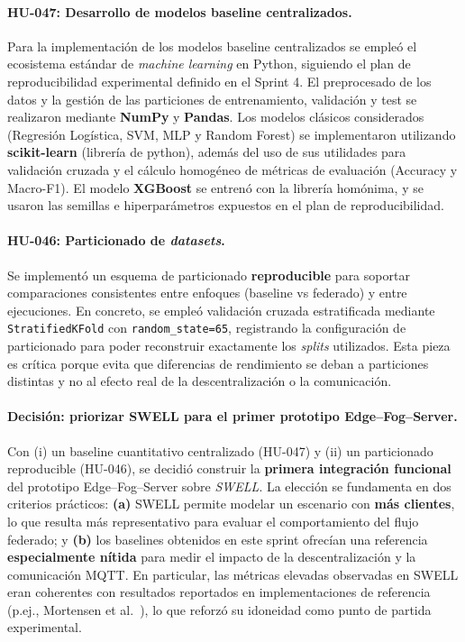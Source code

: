 \documentclass{report}
\begin{document}
\paragraph{HU-047: Desarrollo de modelos baseline centralizados.}
Para la implementación de los modelos baseline centralizados se empleó el ecosistema estándar de \textit{machine learning} en Python, siguiendo  el plan de reproducibilidad experimental definido en el Sprint 4. El preprocesado de los datos y la gestión de las particiones de entrenamiento, validación y test se realizaron mediante \textbf{NumPy} y \textbf{Pandas}. Los modelos clásicos considerados (Regresión Logística, SVM, MLP y Random Forest) se implementaron utilizando \textbf{scikit-learn} (librería de python), además del uso de sus utilidades para validación cruzada y el cálculo homogéneo de métricas de evaluación (Accuracy y Macro-F1). El modelo \textbf{XGBoost} se entrenó con la librería homónima, y se usaron las semillas e hiperparámetros expuestos en el plan de reproducibilidad. 


\vspace{0.15em}
\paragraph{HU-046: Particionado de \textit{datasets}.}
Se implementó un esquema de particionado \textbf{reproducible} para soportar comparaciones consistentes entre enfoques (baseline vs federado) y entre ejecuciones. En concreto, se empleó validación cruzada estratificada mediante \texttt{StratifiedKFold} con \texttt{random\_state=65}, registrando la configuración de particionado para poder reconstruir exactamente los \emph{splits} utilizados. Esta pieza es crítica porque evita que diferencias de rendimiento se deban a particiones distintas y no al efecto real de la descentralización o la comunicación.

\vspace{0.15em}
\paragraph{Decisión: priorizar SWELL para el primer prototipo Edge--Fog--Server.}
Con (i) un baseline cuantitativo centralizado (HU-047) y (ii) un particionado reproducible (HU-046), se decidió construir la \textbf{primera integración funcional} del prototipo Edge--Fog--Server sobre \textit{SWELL}. La elección se fundamenta en dos criterios prácticos: 
\textbf{(a)} SWELL permite modelar un escenario con \textbf{más clientes}, lo que resulta más representativo para evaluar el comportamiento del flujo federado; y 
\textbf{(b)} los baselines obtenidos en este sprint ofrecían una referencia \textbf{especialmente nítida} para medir el impacto de la descentralización y la comunicación MQTT. En particular, las métricas elevadas observadas en SWELL eran coherentes con resultados reportados en implementaciones de referencia (p.ej., Mortensen et al.~\cite{Mortensen2023SWELL}), lo que reforzó su idoneidad como punto de partida experimental.
\end{document}
